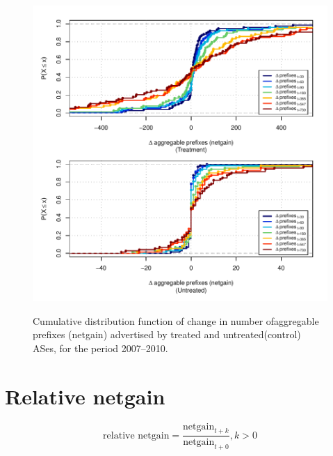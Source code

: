 \begin{figure}[H]
\begin{centering}
\begin{singlespace}
    \includegraphics[width=6in]{figures/behavior-netgain-2007_2010-corr.pdf}
    \vspace{-2em}\\
    \caption{Cumulative distribution function of change in number ofaggregable prefixes (netgain) advertised by treated and untreated(control) ASes, for the period 2007--2010.}
\end{singlespace}
\end{centering}
\end{figure}

\section{Relative netgain}

\[
\textrm{relative netgain} = \frac{\textrm{netgain}_{t+k}}
                                 {\textrm{netgain}_{t+0}}, k > 0
\]


